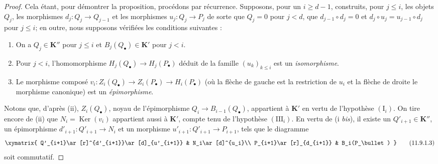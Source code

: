 \begin{proof}
Cela étant, pour démontrer la proposition, procédons par récurrence.
Supposons, pour un $i\geq d-1$, construits, pour $j\leq i$, les objets $Q_j$,
les morphismes $d_j:Q_j\to Q_{j-1}$ et les morphismes $u_j:Q_j\to P_j$ de
sorte que $Q_j=0$ pour $j<d$, que $d_{j-1}\circ d_j=0$ et
$d_j\circ u_j=u_{j-1}\circ d_j$ pour $j\leq i$; en outre, nous supposons
vérifiées les conditions suivantes :
\begin{enumerate}
\item[$(\mathrm I_i)$] On a $Q_j\in\boldsymbol{K}''$ pour $j\leq i$ et
$B_j(Q_\bullet)\in\boldsymbol{K}'$ pour $j<i$.
\item[$(\mathrm{II}_i)$] Pour $j<i$, l'homomorphisme
$H_j(Q_\bullet)\to H_j(P_\bullet)$ déduit de la famille $(u_k)_{k\leq i}$
est un \emph{isomorphisme}.
\item[$(\mathrm{III}_i)$] Le morphisme composé
$v_i:Z_i(Q_\bullet)\to Z_i(P_\bullet)
\to H_i(P_\bullet)$
(où la flèche de gauche est la restriction de $u_i$ et la flèche de droite
le morphisme canonique) est un \emph{épimorphisme}.
\end{enumerate}
Notons que, d'après (ii), $Z_i(Q_\bullet)$, noyau de l'épimorphisme
$Q_i\to B_{i-1}(Q_\bullet)$, appartient à $\boldsymbol{K}'$ en vertu de l'hypothèse
$(\mathrm I_i)$. On tire encore de (ii) que
$N_i=\operatorname{Ker}(v_i)$ appartient aussi à $\boldsymbol{K}'$, compte tenu de
l'hypothèse $(\mathrm{III}_i)$. En vertu de (i \emph{bis}), il existe un
$Q'_{i+1}\in\boldsymbol{K}''$, un épimorphisme $d'_{i+1}:Q'_{i+1}\to N_i$ et un
morphisme $u'_{i+1}:Q'_{i+1}\to P_{i+1}$, tels que le diagramme
\[
\xymatrix{
Q'_{i+1}\ar[r]^{d'_{i+1}}\ar[d]_{u'_{i+1}} &
N_i\ar[d]^{u_i}\\
P_{i+1}\ar[r]_{d_{i+1}} & B_i(P_\bullet)
}
\tag{11.9.1.3}\label{0.11.9.1.3-fr}
\]
soit commutatif.


\end{proof}
